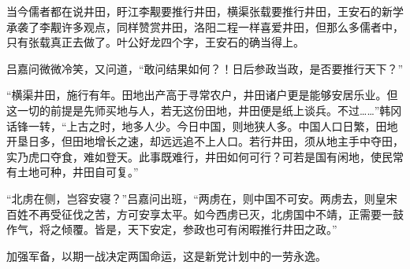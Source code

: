 当今儒者都在说井田，盱江李觏要推行井田，横渠张载要推行井田，王安石的新学承袭了李觏许多观点，同样赞赏井田，洛阳二程一样喜爱井田，但那么多儒者中，只有张载真正去做了。叶公好龙四个字，王安石的确当得上。

吕嘉问微微冷笑，又问道，“敢问结果如何？！日后参政当政，是否要推行天下？”

“横渠井田，施行有年。田地出产高于寻常农户，井田诸户更是能够安居乐业。但这一切的前提是先师买地与人，若无这份田地，井田便是纸上谈兵。不过……”韩冈话锋一转，“上古之时，地多人少。今日中国，则地狭人多。中国人口日繁，田地开垦日多，但田地增长之速，却远远追不上人口。若行井田，须从地主手中夺田，实乃虎口夺食，难如登天。此事既难行，井田如何可行？可若是国有闲地，使民常有土地可种，井田自可复。”

“北虏在侧，岂容安寝？”吕嘉问出班，“两虏在，则中国不可安。两虏去，则皇宋百姓不再受征伐之苦，方可安享太平。如今西虏已灭，北虏国中不靖，正需要一鼓作气，将之倾覆。皆是，天下安定，参政也可有闲暇推行井田之政。”

加强军备，以期一战决定两国命运，这是新党计划中的一劳永逸。

